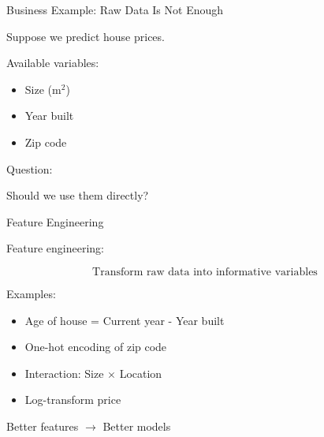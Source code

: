 \documentclass{beamer}
\begin{document}
\begin{frame}{Business Example: Raw Data Is Not Enough}

Suppose we predict house prices.

Available variables:

\begin{itemize}
    \item Size (m$^2$)
    \item Year built
    \item Zip code
\end{itemize}

\vspace{0.5cm}

Question:

Should we use them directly?

\end{frame}

\begin{frame}{Feature Engineering}

Feature engineering:

\[
\text{Transform raw data into informative variables}
\]

\vspace{0.5cm}

Examples:

\begin{itemize}
    \item Age of house = Current year - Year built
    \item One-hot encoding of zip code
    \item Interaction: Size $\times$ Location
    \item Log-transform price
\end{itemize}

\vspace{0.5cm}

Better features $\rightarrow$ Better models

\end{frame}
\end{document}
